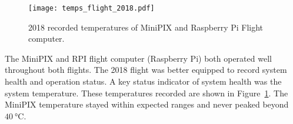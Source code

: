 



\begin{figure}[H]
\centering
\texttt{[image: temps\_flight\_2018.pdf]}
\caption{2018 recorded temperatures of MiniPIX and Raspberry Pi Flight computer.}
\label{fig:temps_2018}
\end{figure}
%
The MiniPIX and RPI flight computer (Raspberry Pi) both operated well throughout both flights.  The 2018 flight was better equipped to record system health and operation status.  A key status indicator of system health was the system temperature.  These temperatures recorded are shown in Figure~\ref{fig:temps_2018}.  The MiniPIX temperature stayed within expected ranges and never peaked beyond $\SI{40}{\degreeCelsius}$.  

